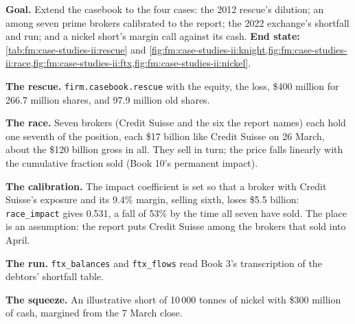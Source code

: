 \begin{tutorial}
\textbf{Goal.} Extend the casebook to the four cases: the 2012 rescue's dilution; an  among seven prime brokers calibrated to the report;
the 2022 exchange's shortfall and run; and a nickel short's margin call against its cash. \textbf{End state:}
\cref{tab:fm:case-studies-ii:rescue} and \cref{fig:fm:case-studies-ii:knight,fig:fm:case-studies-ii:race,fig:fm:case-studies-ii:ftx,fig:fm:case-studies-ii:nickel}.
\begin{tutsteps}
\item \textbf{The rescue.} \texttt{firm.casebook.rescue} with the equity, the loss, \$400 million for 266.7 million shares, and 97.9 million old shares.
\item \textbf{The race.} Seven brokers (Credit Suisse and the six the report names) each hold one seventh of the position, each \$17 billion like Credit
Suisse on 26 March, about the \$120 billion gross in all. They sell in turn; the price falls linearly with the cumulative fraction sold (Book 10's
permanent impact).
\item \textbf{The calibration.} The impact coefficient is set so that a broker with Credit Suisse's exposure and its 9.4\% margin, selling sixth, loses
\$5.5 billion: \texttt{race\_impact} gives 0.531, a fall of 53\% by the time all seven have sold. The place is an assumption: the report puts Credit
Suisse among the brokers that sold into April.
\item \textbf{The run.} \texttt{ftx\_balances} and \texttt{ftx\_flows} read Book 3's transcription of the debtors' shortfall table.
\item \textbf{The squeeze.} An illustrative short of 10\,000 tonnes of nickel with \$300 million of cash, margined from the 7 March close.
\end{tutsteps}
\end{tutorial}

\label{lst:fm:case-studies-ii:race}

